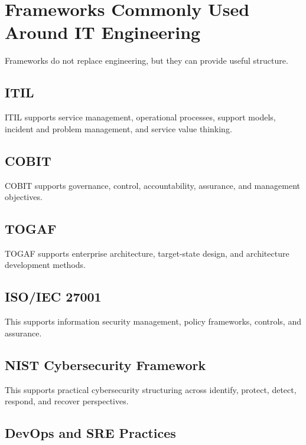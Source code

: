 \documentclass[
  british,
  letterpaper,
  DIV=11,
  numbers=noendperiod]{scrartcl}
\begin{document}
\section{Frameworks Commonly Used Around IT
Engineering}\label{frameworks-commonly-used-around-it-engineering}

Frameworks do not replace engineering, but they can provide useful
structure.

\subsection{ITIL}\label{itil}

ITIL supports service management, operational processes, support models,
incident and problem management, and service value thinking.

\subsection{COBIT}\label{cobit}

COBIT supports governance, control, accountability, assurance, and
management objectives.

\subsection{TOGAF}\label{togaf}

TOGAF supports enterprise architecture, target-state design, and
architecture development methods.

\subsection{ISO/IEC 27001}\label{isoiec-27001}

This supports information security management, policy frameworks,
controls, and assurance.

\subsection{NIST Cybersecurity
Framework}\label{nist-cybersecurity-framework}

This supports practical cybersecurity structuring across identify,
protect, detect, respond, and recover perspectives.

\subsection{DevOps and SRE Practices}\label{devops-and-sre-practices}
\end{document}
